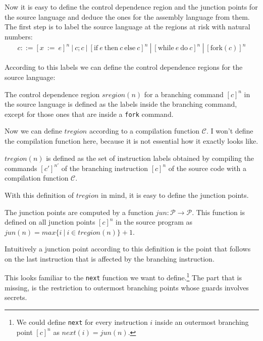 \documentclass[a4paper,10pt]{llncs}
\begin{document}
Now it is easy to define the control dependence region and the junction points for the source
language and deduce the ones for the assembly language from them. The first step is to label the
source language at the regions at risk with natural numbers:
\begin{align*}
c ::= [x\ :=\ e]^n\ |\ c;c\ |\ [\text{if}\ e\ \text{then}\ c\ \text{else}\ c]^n\ |\ [\text{while}\ e\ \text{do}\ c]^n\ |\ [\text{fork}(c)]^n
\end{align*}

According to this labels we can define the control dependence regions for the source language:

\begin{definition}
The control dependence region $sregion(n)$ for a branching command $[c]^n$ in the source language is
defined as the labels inside the branching command, except for those ones that are inside a
\texttt{fork} command.
\end{definition}

Now we can define $tregion$ according to a compilation function $\mathcal{C}$. I won't define
the compilation function here, because it is not essential how it exactly looks like.

\begin{definition}
$tregion(n)$ is defined as the set of instruction labels obtained by compiling the commands
$[c']^{n'}$ of the branching instruction $[c]^n$ of the source code with a compilation function $\mathcal{C}$.
\end{definition}

With this definition of $tregion$ in mind, it is easy to define the junction points.

\begin{definition}
The junction points are computed by a function $jun: \mathcal{P} \rightarrow \mathcal{P}$. This function is defined
on all junction points $[c]^n$ in the source program as $jun(n) = max \{i\ |\ i \in tregion(n)\} + 1$.
\end{definition}

Intuitively a junction point according to this definition is the point that follows on the last instruction
that is affected by the branching instruction.

This looks familiar to the \texttt{next} function we want to define.\footnote{We could define \texttt{next} for
every instruction $i$ inside an outermost branching point $[c]^n$ as $next(i) = jun(n)$.} The part that is
missing, is the restriction to outermost branching points whose guards involves secrets.
\end{document}
